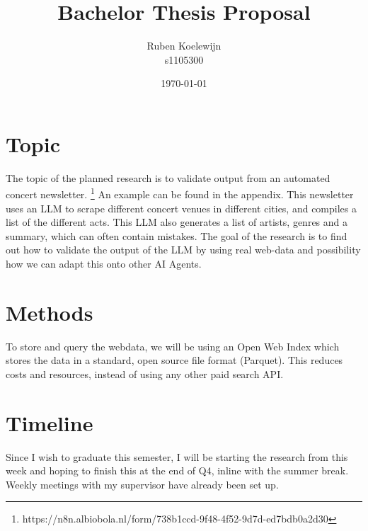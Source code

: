 \documentclass{article}
\title{Bachelor Thesis Proposal}
\author{Ruben Koelewijn \\ s1105300}
\date{\today}
\begin{document}
\maketitle

\section{Topic}
The topic of the planned research is to validate output from an automated concert newsletter. \footnote{https://n8n.albiobola.nl/form/738b1ccd-9f48-4f52-9d7d-ed7bdb0a2d30} An example can be found in the appendix.  This newsletter uses an LLM to scrape different concert venues in different cities, and compiles a list of the different acts. This LLM also generates a list of artists, genres and a summary, which can often contain mistakes. The goal of the research is to find out how to validate the output of the LLM by using real web-data and possibility how we can adapt this onto other AI Agents. 

\section{Methods}
To store and query the webdata, we will be using an Open Web Index \cite{hendriksen2026open} which stores the data in a standard, open source file format (Parquet). This reduces costs and resources, instead of using any other paid search API. 

\section{Timeline} 
Since I wish to graduate this semester, I will be starting the research from this week and hoping to finish this at the end of Q4, inline with the summer break. Weekly meetings with my supervisor have already been set up. 

\newpage
\end{document}
